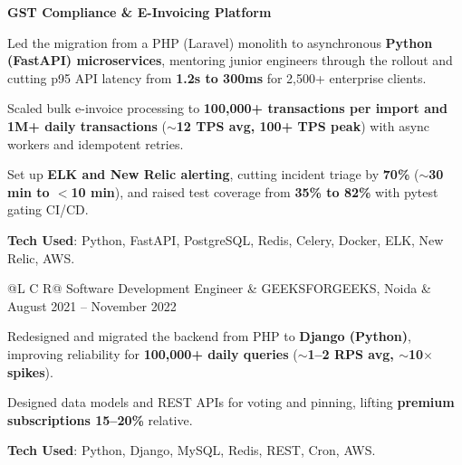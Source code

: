\textcolor{Project}{\textbf{GST Compliance \& E-Invoicing Platform}}
\vspace{-1ex}
\begin{zitemize}
    \item Led the migration from a PHP (Laravel) monolith to asynchronous \textbf{Python (FastAPI) microservices}, mentoring junior engineers through the rollout and cutting p95 API latency from \textbf{1.2s to 300ms} for 2,500+ enterprise clients.
    \item Scaled bulk e-invoice processing to \textbf{100,000+ transactions per import and 1M+ daily transactions} (\textbf{$\sim$12 TPS avg, 100+ TPS peak}) with async workers and idempotent retries.
    \item Set up \textbf{ELK and New Relic alerting}, cutting incident triage by \textbf{70\%} (\textbf{$\sim$30 min to $<$10 min}), and raised test coverage from \textbf{35\% to 82\%} with pytest gating CI/CD.
    \item \textbf{Tech Used}: Python, FastAPI, PostgreSQL, Redis, Celery, Docker, ELK, New Relic, AWS.
\end{zitemize}

\vspace{1ex}
\noindent
\begin{tabularx}{\textwidth}{@{}L C R@{}}
\textcolor{role}{Software Development Engineer} & \textcolor{company}{GEEKSFORGEEKS, Noida} & \textcolor{date}{August 2021 -- November 2022}\\
\end{tabularx}
\vspace{-3ex}
\begin{zitemize}
    \item Redesigned and migrated the backend from PHP to \textbf{Django (Python)}, improving reliability for \textbf{100,000+ daily queries} (\textbf{$\sim$1--2 RPS avg, $\sim$10$\times$ spikes}).
    \item Designed data models and REST APIs for voting and pinning, lifting \textbf{premium subscriptions 15--20\%} relative.
    \item \textbf{Tech Used}: Python, Django, MySQL, Redis, REST, Cron, AWS.
\end{zitemize}
